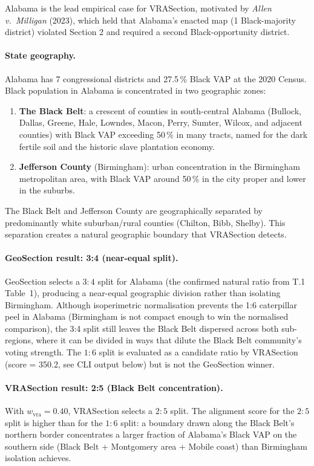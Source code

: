 Alabama is the lead empirical case for VRASection, motivated by
\emph{Allen v.\ Milligan} (2023), which held that Alabama's enacted map
(1 Black-majority district) violated Section 2 and required a second
Black-opportunity district.

\paragraph{State geography.}
Alabama has 7 congressional districts and 27.5\,\% Black VAP at the
2020 Census.
Black population in Alabama is concentrated in two geographic zones:
\begin{enumerate}
\item \textbf{The Black Belt}: a crescent of counties in south-central Alabama
  (Bullock, Dallas, Greene, Hale, Lowndes, Macon, Perry, Sumter,
  Wilcox, and adjacent counties) with Black VAP exceeding 50\,\% in many tracts,
  named for the dark fertile soil and the historic slave plantation economy.
\item \textbf{Jefferson County} (Birmingham): urban concentration in the
  Birmingham metropolitan area, with Black VAP around 50\,\% in the city
  proper and lower in the suburbs.
\end{enumerate}
The Black Belt and Jefferson County are geographically separated by
predominantly white suburban/rural counties (Chilton, Bibb, Shelby).
This separation creates a natural geographic boundary that VRASection detects.

\paragraph{GeoSection result: 3:4 (near-equal split).}
GeoSection selects a $3:4$ split for Alabama (the confirmed natural ratio from T.1 Table~1), producing a near-equal geographic division rather than isolating Birmingham.
Although isoperimetric normalisation prevents the 1:6 caterpillar peel in Alabama
(Birmingham is not compact enough to win the normalised comparison), the 3:4 split
still leaves the Black Belt dispersed across both sub-regions,
where it can be divided in ways that dilute the Black Belt community's
voting strength.
The $1:6$ split is evaluated as a candidate ratio by VRASection (score = 350.2,
see CLI output below) but is not the GeoSection winner.

\paragraph{VRASection result: 2:5 (Black Belt concentration).}
With $w_\text{vra} = 0.40$, VRASection selects a $2:5$ split.
The alignment score for the $2:5$ split is higher than for the $1:6$ split:
a boundary drawn along the Black Belt's northern border concentrates a
larger fraction of Alabama's Black VAP on the southern side (Black Belt +
Montgomery area + Mobile coast) than Birmingham isolation achieves.

